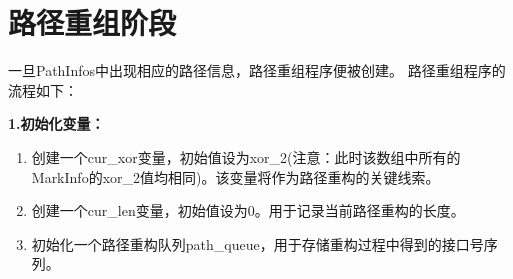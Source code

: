 




\section{路径重组阶段}
一旦PathInfos中出现相应的路径信息，路径重组程序便被创建。
路径重组程序的流程如下：\par
\textbf{1.初始化变量：}\par
\begin{enumerate}[label=\roman*.]
  \item 创建一个cur\_xor变量，初始值设为xor\_2(注意：此时该数组中所有的MarkInfo的xor\_2值均相同)。该变量将作为路径重构的关键线索。
  \item 创建一个cur\_len变量，初始值设为0。用于记录当前路径重构的长度。
  \item 初始化一个路径重构队列path\_queue，用于存储重构过程中得到的接口号序列。
\end{enumerate}

